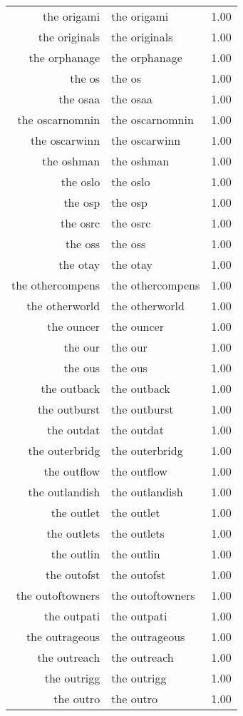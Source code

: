 \begin{table}[ht]
\begin{tabular}{rlr}
  the origami & the origami & 1.00 \\ 
  the originals & the originals & 1.00 \\ 
  the orphanage & the orphanage & 1.00 \\ 
  the os & the os & 1.00 \\ 
  the osaa & the osaa & 1.00 \\ 
  the oscarnomnin & the oscarnomnin & 1.00 \\ 
  the oscarwinn & the oscarwinn & 1.00 \\ 
  the oshman & the oshman & 1.00 \\ 
  the oslo & the oslo & 1.00 \\ 
  the osp & the osp & 1.00 \\ 
  the osrc & the osrc & 1.00 \\ 
  the oss & the oss & 1.00 \\ 
  the otay & the otay & 1.00 \\ 
  the othercompens & the othercompens & 1.00 \\ 
  the otherworld & the otherworld & 1.00 \\ 
  the ouncer & the ouncer & 1.00 \\ 
  the our & the our & 1.00 \\ 
  the ous & the ous & 1.00 \\ 
  the outback & the outback & 1.00 \\ 
  the outburst & the outburst & 1.00 \\ 
  the outdat & the outdat & 1.00 \\ 
  the outerbridg & the outerbridg & 1.00 \\ 
  the outflow & the outflow & 1.00 \\ 
  the outlandish & the outlandish & 1.00 \\ 
  the outlet & the outlet & 1.00 \\ 
  the outlets & the outlets & 1.00 \\ 
  the outlin & the outlin & 1.00 \\ 
  the outofst & the outofst & 1.00 \\ 
  the outoftowners & the outoftowners & 1.00 \\ 
  the outpati & the outpati & 1.00 \\ 
  the outrageous & the outrageous & 1.00 \\ 
  the outreach & the outreach & 1.00 \\ 
  the outrigg & the outrigg & 1.00 \\ 
  the outro & the outro & 1.00 \\ 

\end{tabular}
\end{table}
